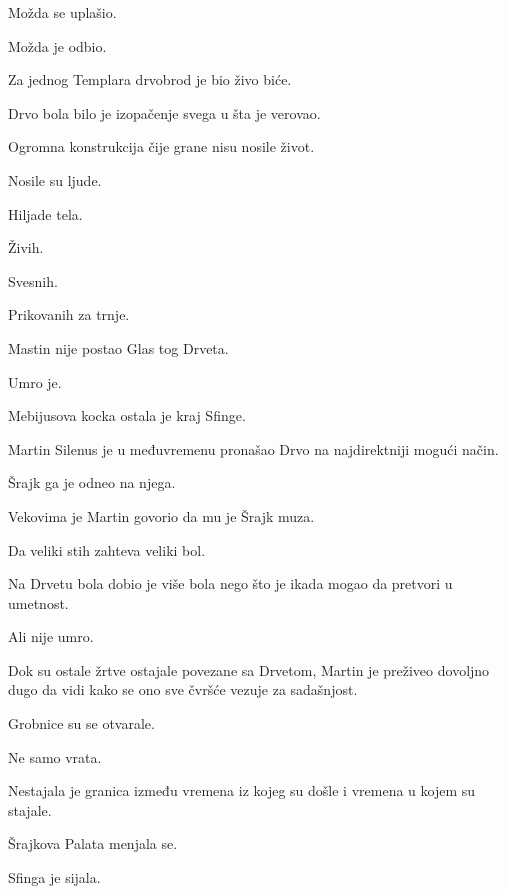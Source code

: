 \bigskip

Možda se uplašio.

Možda je odbio.

\bigskip

Za jednog Templara drvobrod je bio živo biće.

Drvo bola bilo je izopačenje svega u šta je verovao.

Ogromna konstrukcija čije grane nisu nosile život.

Nosile su ljude.

\bigskip

Hiljade tela.

Živih.

Svesnih.

Prikovanih za trnje.

\bigskip

Mastin nije postao Glas tog Drveta.

Umro je.

\bigskip

Mebijusova kocka ostala je kraj Sfinge.

\bigskip

Martin Silenus je u međuvremenu pronašao Drvo na najdirektniji mogući način.

Šrajk ga je odneo na njega.

\bigskip

Vekovima je Martin govorio da mu je Šrajk muza.

Da veliki stih zahteva veliki bol.

\bigskip

Na Drvetu bola dobio je više bola nego što je ikada mogao da pretvori u umetnost.

\bigskip

Ali nije umro.

\bigskip

Dok su ostale žrtve ostajale povezane sa Drvetom, Martin je preživeo dovoljno dugo da vidi kako se ono sve čvršće vezuje za sadašnjost.

\bigskip

Grobnice su se otvarale.

\bigskip

Ne samo vrata.

\bigskip

Nestajala je granica između vremena iz kojeg su došle i vremena u kojem su stajale.

\bigskip

Šrajkova Palata menjala se.

Sfinga je sijala.

